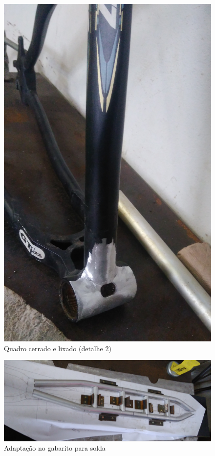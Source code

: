 	\graphicspath{{figuras/}}
	\begin{figure}[h!]
		\centering
		\includegraphics[scale=0.08]{quadro_cerrado_2.jpg}
		\caption{Quadro cerrado e lixado (detalhe 2)}
		\label{img:quadro_cerrado_2}
	\end{figure}
	
	\graphicspath{{figuras/}}	
	\begin{figure}[h!]
		\centering
		\includegraphics[scale=0.12]{gabarito_adap.jpg}
		\caption{Adaptação no gabarito para solda}
		\label{img:gabarito_adap}
	\end{figure}

